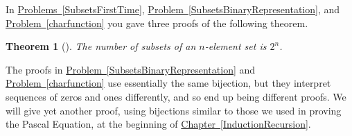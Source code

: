 \documentclass[10pt,]{book}
\theoremstyle{plain}
\newtheorem{theorem}{Theorem}[section]
\theoremstyle{definition}
\theoremstyle{definition}
\numberwithin{equation}{chapter}
\begin{document}
In \hyperref[SubsetsFirstTime]{Problems~\ref{SubsetsFirstTime}}, \hyperref[SubsetsBinaryRepresentation]{Problem~\ref{SubsetsBinaryRepresentation}}, and \hyperref[charfunction]{Problem~\ref{charfunction}} you gave three proofs of the following theorem.%
\begin{theorem}[{}]\label{theorem-1}
The number of subsets of an \(n\)-element set is \(2^n\).%
\end{theorem}
The proofs in \hyperref[SubsetsBinaryRepresentation]{Problem~\ref{SubsetsBinaryRepresentation}} and \hyperref[charfunction]{Problem~\ref{charfunction}} use essentially the same bijection, but they interpret sequences of zeros and ones differently, and so end up being different proofs. We will give yet another proof, using bijections similar to those we used in proving the Pascal Equation, at the beginning of \hyperref[InductionRecursion]{Chapter~\ref{InductionRecursion}}.%
\typeout{************************************************}
\typeout{************************************************}
\end{document}
